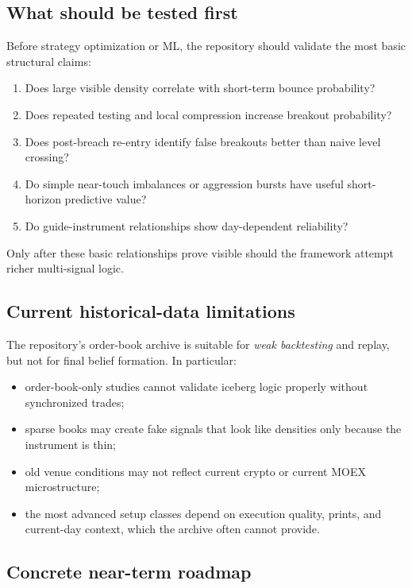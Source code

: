 \subsection{What should be tested first}

Before strategy optimization or ML, the repository should validate the most basic structural claims:

\begin{enumerate}[leftmargin=1.5em]
\item Does large visible density correlate with short-term bounce probability?
\item Does repeated testing and local compression increase breakout probability?
\item Does post-breach re-entry identify false breakouts better than naive level crossing?
\item Do simple near-touch imbalances or aggression bursts have useful short-horizon predictive value?
\item Do guide-instrument relationships show day-dependent reliability?
\end{enumerate}

Only after these basic relationships prove visible should the framework attempt richer multi-signal logic.

\subsection{Current historical-data limitations}

The repository's order-book archive is suitable for \emph{weak backtesting} and replay, but not for final belief formation. In particular:

\begin{itemize}[leftmargin=1.5em]
\item order-book-only studies cannot validate iceberg logic properly without synchronized trades;
\item sparse books may create fake signals that look like densities only because the instrument is thin;
\item old venue conditions may not reflect current crypto or current MOEX microstructure;
\item the most advanced setup classes depend on execution quality, prints, and current-day context, which the archive often cannot provide.
\end{itemize}

\subsection{Concrete near-term roadmap}

